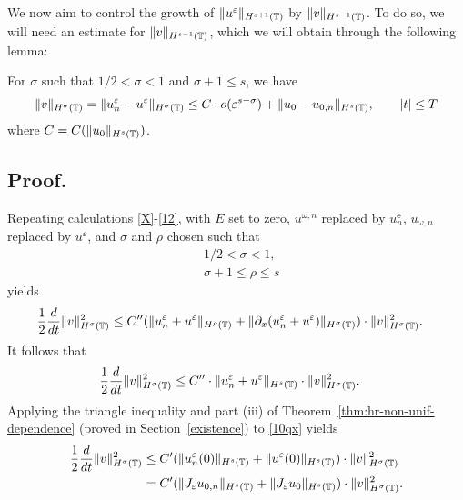 We now aim to control the growth of $\|u^\varepsilon\|_{H^{s+1}(\mathbb{T})}$ by
$\|v\|_{H^{s-1}(\mathbb{T})}$. To do so, we will need an estimate for
$\|v\|_{H^{s-1}(\mathbb{T})}$, which we will obtain through the following lemma:
%
%
%
%
\begin{lemma}
\label{lem:left}
For $\sigma$ such that $1/2 < \sigma < 1$ and $\sigma + 1 \le s$, we have
\begin{equation}
\label{lem6rq}
\begin{split}
\|v\|_{H^{\sigma}(\mathbb{T})} = 
\|u^\varepsilon_n - u^\varepsilon\|_{H^\sigma(\mathbb{T})}
\le C \cdot o(\varepsilon^{s- \sigma }) + \|u_0 - u_{0,n} \|_{H^s(\mathbb{T})}, \qquad |t| \le T
\end{split}
\end{equation}
where $C=C(\|u_0\|_{H^s(\mathbb{T})})$.
\end{lemma}
%
%
%
\subsection{Proof.}
Repeating calculations \eqref{X}-\eqref{12}, with $E$ set to zero, $u^{\omega,n}$
replaced by $u^\ee_n$, $u_{\omega,n}$ replaced by $u^\ee$, and $\sigma$ and $\rho$ chosen such that
\begin{equation}
\label{size_of_sigma'}
\begin{split}
& 1/2 < \sigma < 1,
\\
& \sigma + 1 \le \rho \le s 
\end{split}
\end{equation}
yields
\begin{equation*}
\begin{split}
\frac{1}{2}\frac{d}{dt} \|v\|_{H^\sigma(\mathbb{T})}^2
& \le
C'' (\|u^{\varepsilon}_n + u^\varepsilon \|_{H^{\rho}(\mathbb{T})} +
\|\partial_x(u^{\varepsilon}_n + u^\varepsilon) \|_{H^\sigma(\mathbb{T})})
\cdot \|v\|_{H^\sigma(\mathbb{T})}^2.
\end{split}
\end{equation*}
\medskip
It follows that 
\begin{equation}
\begin{split}
\frac{1}{2}\frac{d}{dt} \|v\|_{H^{\sigma}(\mathbb{T})}^2
& \le
C'' \cdot \|u^{\varepsilon}_n
+ u^\varepsilon\|_{H^{s}(\mathbb{T})}\cdot \|v\|_{H^{\sigma}(\mathbb{T})}^2.
\label{10qx}
\end{split}
\end{equation}
Applying the triangle inequality and
part (iii) of Theorem~\ref{thm:hr-non-unif-dependence} (proved in
Section~\ref{existence})
to \eqref{10qx} yields
%
\begin{equation}
\begin{split}
\label{11qx}
\frac{1}{2}\frac{d}{dt} \|v\|_{H^{\sigma}(\mathbb{T})}^2
& \le
C' (\|u^{\varepsilon}_n(0)\|_{H^{s}(\mathbb{T})}
+ \|u^\varepsilon(0)\|_{H^{s}(\mathbb{T})})\cdot \|v\|_{H^{\sigma}(\mathbb{T})}^2
\\
& = C' (\|J_\varepsilon u_{0,n}\|_{H^{s}(\mathbb{T})}
+ \|J_\varepsilon u_0\|_{H^{s}(\mathbb{T})})\cdot \|v\|_{H^{\sigma}(\mathbb{T})}^2.
\end{split}
\end{equation}
